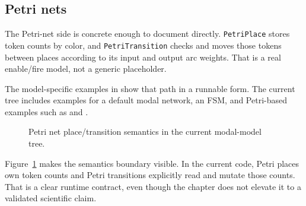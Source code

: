 \subsection{Petri nets}
\label{subsec:petri-nets}

The Petri-net side is concrete enough to document directly. \texttt{PetriPlace}
stores token counts by color, and \texttt{PetriTransition} checks and moves
those tokens between places according to its input and output arc weights.
That is a real enable/fire model, not a generic placeholder.

The model-specific examples in 
show that path in a runnable form. The current tree includes examples for a
default modal network, an FSM, and Petri-based examples such as
 and .

\begin{figure}[htbp]
\centering
\caption{Petri net place/transition semantics in the current modal-model tree.}
\label{fig:petri-net-flow}
\end{figure}

Figure~\ref{fig:petri-net-flow} makes the semantics boundary visible. In the
current code, Petri places own token counts and Petri transitions explicitly
read and mutate those counts. That is a clear runtime contract, even though the
chapter does not elevate it to a validated scientific claim.

